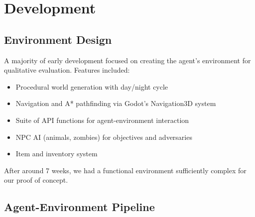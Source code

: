 \documentclass{article}
\begin{document}
\section{Development}
\subsection{Environment Design}
A majority of early development focused on creating the agent's environment for qualitative evaluation.
Features included:
\begin{itemize}
    \item Procedural world generation with day/night cycle
    \item Navigation and A* pathfinding via Godot's Navigation3D system
    \item Suite of API functions for agent-environment interaction
    \item NPC AI (animals, zombies) for objectives and adversaries
    \item Item and inventory system
\end{itemize}
After around 7 weeks, we had a functional environment sufficiently complex for our proof of concept.

\subsection{Agent-Environment Pipeline}
\end{document}
